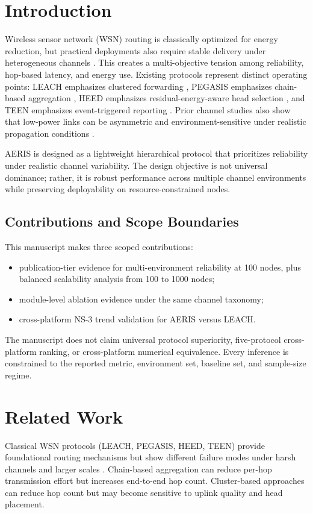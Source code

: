 \documentclass[sensors,article,submit,moreauthors,pdftex]{Definitions/mdpi}
\begin{document}
\section{Introduction}
Wireless sensor network (WSN) routing is classically optimized for energy reduction, but practical deployments also require stable delivery under heterogeneous channels \cite{Akyildiz2002Survey,Rault2016Energy,Kandris2020}. This creates a multi-objective tension among reliability, hop-based latency, and energy use. Existing protocols represent distinct operating points: LEACH emphasizes clustered forwarding \cite{Heinzelman2000LEACH}, PEGASIS emphasizes chain-based aggregation \cite{Lindsey2002PEGASIS}, HEED emphasizes residual-energy-aware head selection \cite{Younis2004HEED}, and TEEN emphasizes event-triggered reporting \cite{Manjeshwar2001TEEN}. Prior channel studies also show that low-power links can be asymmetric and environment-sensitive under realistic propagation conditions \cite{Zuniga2004,Zuniga2007Asymmetry,Baccour2012RLQE}.

AERIS is designed as a lightweight hierarchical protocol that prioritizes reliability under realistic channel variability. The design objective is not universal dominance; rather, it is robust performance across multiple channel environments while preserving deployability on resource-constrained nodes.

\subsection*{Contributions and Scope Boundaries}
This manuscript makes three scoped contributions:
\begin{itemize}
\item publication-tier evidence for multi-environment reliability at 100 nodes, plus balanced scalability analysis from 100 to 1000 nodes;
\item module-level ablation evidence under the same channel taxonomy;
\item cross-platform NS-3 trend validation for AERIS versus LEACH.
\end{itemize}
The manuscript does not claim universal protocol superiority, five-protocol cross-platform ranking, or cross-platform numerical equivalence. Every inference is constrained to the reported metric, environment set, baseline set, and sample-size regime.

\section{Related Work}
Classical WSN protocols (LEACH, PEGASIS, HEED, TEEN) provide foundational routing mechanisms but show different failure modes under harsh channels and larger scales \cite{Heinzelman2002LEACH,Lindsey2002PEGASIS,Younis2004HEED,Kandris2020}. Chain-based aggregation can reduce per-hop transmission effort but increases end-to-end hop count. Cluster-based approaches can reduce hop count but may become sensitive to uplink quality and head placement.
\end{document}
